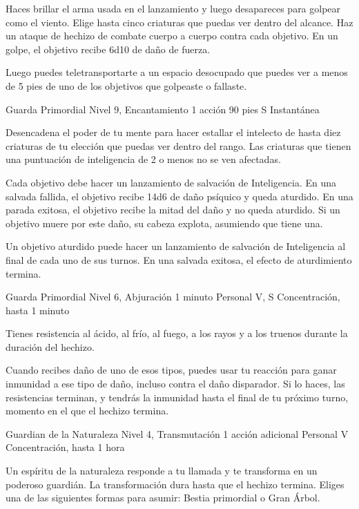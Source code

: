 \documentclass[a4paper,twocolumn,openany,10pt]{dndbook}
\begin{document}
	Haces brillar el arma usada en el lanzamiento y luego desapareces para golpear como el viento. Elige hasta cinco criaturas
	que puedas ver dentro del alcance. Haz un ataque de hechizo de combate cuerpo a cuerpo contra cada objetivo. En un golpe, el
	objetivo recibe 6d10 de daño de fuerza.
	
	Luego puedes teletransportarte a un espacio desocupado que puedes ver a menos de 5 pies de uno de los objetivos que
	golpeaste o fallaste. 

\spellheader%
	{Guarda Primordial}
	{Nivel 9, Encantamiento}
	{1 acción}
	{90 pies}
	{S}
	{Instantánea}
	
	Desencadena el poder de tu mente para hacer estallar el intelecto de hasta diez criaturas de tu elección que puedas ver
	dentro del rango. Las criaturas que tienen una puntuación de inteligencia de 2 o menos no se ven afectadas.
	
	Cada objetivo debe hacer un lanzamiento de salvación de Inteligencia. En una salvada fallida, el objetivo recibe 14d6 de
	daño psíquico y queda aturdido. En una parada exitosa, el objetivo recibe la mitad del daño y no queda aturdido. Si un
	objetivo muere por este daño, su cabeza explota, asumiendo que tiene una.
	
	Un objetivo aturdido puede hacer un lanzamiento de salvación de Inteligencia al final de cada uno de sus turnos. En una
	salvada exitosa, el efecto de aturdimiento termina. 

\spellheader%
	{Guarda Primordial}
	{Nivel 6, Abjuración}
	{1 minuto}
	{Personal}
	{V, S}
	{Concentración, hasta 1 minuto}
	
	Tienes resistencia al ácido, al frío, al fuego, a los rayos y a los truenos durante la duración del hechizo.
	
	Cuando recibes daño de uno de esos tipos, puedes usar tu reacción para ganar inmunidad a ese tipo de daño, incluso contra el
	daño disparador. Si lo haces, las resistencias terminan, y tendrás la inmunidad hasta el final de tu próximo turno, momento
	en el que el hechizo termina. 

\spellheader%
	{Guardian de la Naturaleza}
	{Nivel 4, Transmutación}
	{1 acción adicional}
	{Personal}
	{V}
	{Concentración, hasta 1 hora}
	
	Un espíritu de la naturaleza responde a tu llamada y te transforma en un poderoso guardián. La transformación dura hasta que
	el hechizo termina. Eliges una de las siguientes formas para asumir: Bestia primordial o Gran Árbol.
	
\end{document}
